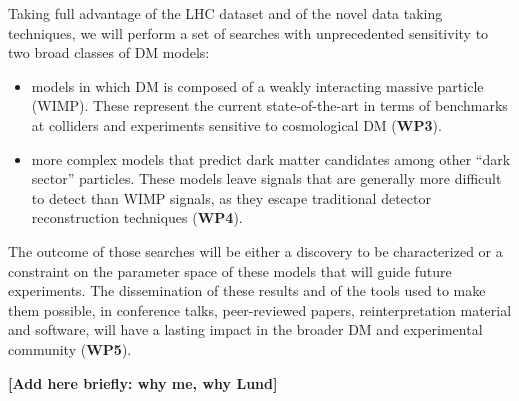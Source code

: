 Taking full advantage of the LHC dataset and of the novel data taking techniques, we will perform a set of searches with unprecedented sensitivity to two broad classes of DM models: 
\begin{itemize}
\item models in which DM is composed of a weakly interacting massive particle (WIMP). These  represent the current state-of-the-art in terms of benchmarks at colliders and experiments sensitive to cosmological DM (\textbf{WP3}).
\item more complex models that predict dark matter candidates among other “dark sector” particles. These models leave signals that are generally more difficult to detect than WIMP signals, as they escape traditional detector reconstruction techniques (\textbf{WP4}).
\end{itemize}

The outcome of those searches will be either a discovery to be characterized or a constraint on the parameter space of these models that will guide future experiments. The dissemination of these results and of the tools used to make them possible, in conference talks, peer-reviewed papers, reinterpretation material and software, will have a lasting impact in the broader DM and experimental community (\textbf{WP5}).

\textbf{[Add here briefly: why me, why Lund]}